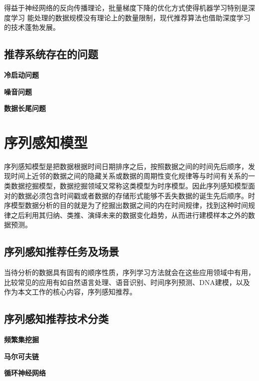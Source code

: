 得益于神经网络的反向传播理论，批量梯度下降的优化方式使得机器学习特别是深度学习%
能处理的数据规模没有理论上的数量限制，现代推荐算法也借助深度学习的技术蓬勃发展。%
%


\subsection{推荐系统存在的问题}

\textbf{冷启动问题}%

\textbf{噪音问题}%

\textbf{数据长尾问题}%


\section{序列感知模型}
序列感知模型是把数据根据时间日期排序之后，按照数据之间的时间先后顺序，发现时间上近邻的数据之间的隐藏关系或数据的周期性变化规律等与时间有关系的一类数据挖掘模型，数据挖掘领域又常称这类模型为时序模型。因此序列感知模型面对的数据必须包含时间戳或者数据的存储形式能够不丢失数据的诞生先后顺序。时序模型数据分析的目的就是为了挖掘出数据之间的内在时间规律，找到这种时间规律之后利用其归纳、类推、演绎未来的数据变化趋势，从而进行建模样本之外的数据预测。


\subsection{序列感知推荐任务及场景}

当待分析的数据具有固有的顺序性质，序列学习方法就会在这些应用领域中有用，比较常见的应用有如自然语言处理、语音识别、时间序列预测、DNA建模，以及作为本文工作的核心内容，序列感知推荐。


\subsection{序列感知推荐技术分类}

\textbf{频繁集挖掘}

\textbf{马尔可夫链}

\textbf{循环神经网络}

